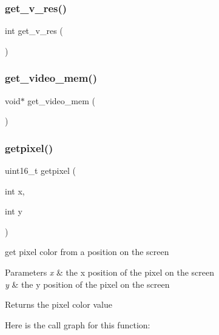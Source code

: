 \mbox{\label{group__video_gaa6c3dbf699d3dda9444bdcd71bf85234}} 
\subsubsection{\texorpdfstring{get\_v\_res()}{get\_v\_res()}}
{\footnotesize\ttfamily int get\+\_\+v\+\_\+res (\begin{DoxyParamCaption}{ }\end{DoxyParamCaption})}

\mbox{\label{group__video_ga1d04069f4e8b1556a7a1ed2cd95bfdea}} 
\subsubsection{\texorpdfstring{get\_video\_mem()}{get\_video\_mem()}}
{\footnotesize\ttfamily void$\ast$ get\+\_\+video\+\_\+mem (\begin{DoxyParamCaption}{ }\end{DoxyParamCaption})}

\mbox{\label{group__video_ga07dd5e8b0cf0aa3aa860a89f4093045b}} 
\subsubsection{\texorpdfstring{getpixel()}{getpixel()}}
{\footnotesize\ttfamily uint16\+\_\+t getpixel (\begin{DoxyParamCaption}\item[{int}]{x,  }\item[{int}]{y }\end{DoxyParamCaption})}



get pixel color from a position on the screen 


\begin{DoxyParams}{Parameters}
{\em x} & the x position of the pixel on the screen \\
\hline
{\em y} & the y position of the pixel on the screen \\
\hline
\end{DoxyParams}
\begin{DoxyReturn}{Returns}
the pixel color value 
\end{DoxyReturn}
Here is the call graph for this function\+:
\mbox{\label{group__video_gac67621adf87bcebb04fab536c7245315}} 
